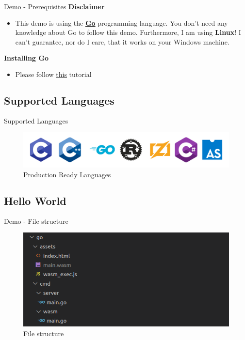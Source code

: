 \documentclass{beamer}
\begin{document}
\begin{frame}{Demo - Prerequisites}
    \textbf{Disclaimer}
    \begin{itemize}
        \item This demo is using the \textbf{\href{https://go.dev/}{Go}} programming language. You don't need any knowledge about Go to follow this demo. Furthermore, I am using \textbf{Linux}! I can't guarantee, nor do I care, that it works on your Windows machine.
    \end{itemize}
    \textbf{Installing Go}
    \begin{itemize}
        \item Please follow \underline{\href{https://go.dev/doc/install}{this}} tutorial
    \end{itemize}
\end{frame}

\subsection{Supported Languages}

\begin{frame}{Supported Languages}
    \begin{figure}
        \includegraphics[scale=0.3]{./images/langs.png}
        \caption{Production Ready Languages}
    \end{figure}
\end{frame}


\subsection{Hello World}

\begin{frame}{Demo - File structure}
    \begin{figure}
        \includegraphics[scale=0.5]{./images/structure.png}
        \caption{File structure}
    \end{figure}
\end{frame}
\end{document}
